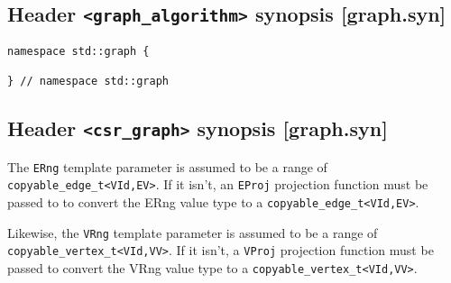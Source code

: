 \documentclass[10pt,onecolumn]{article}
\newcommand{\tcode}[1]{\lstinline[breaklines=true]{#1}}
\begin{document}
\subsection{Header \tcode{<graph_algorithm>} synopsis [graph.syn]}

\begin{lstlisting}
namespace std::graph {

} // namespace std::graph
\end{lstlisting}

\subsection{Header \tcode{<csr_graph>} synopsis [graph.syn]}

The \tcode{ERng} template parameter is assumed to be a range of \tcode{copyable_edge_t<VId,EV>}. If it isn't, an \tcode{EProj} projection function must be passed to to convert the ERng value type to a \tcode{copyable_edge_t<VId,EV>}.

Likewise, the \tcode{VRng} template parameter is assumed to be a range of \tcode{copyable_vertex_t<VId,VV>}. If it isn't, a \tcode{VProj} projection function must be passed to convert the VRng value type to a \tcode{copyable_vertex_t<VId,VV>}.

\end{document}
